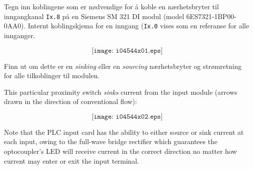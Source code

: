 

Tegn inn koblingene som er nødvendige for å koble en nærhetsbryter til inngangkanal \texttt{Ix.8} på en Siemens SM 321 DI modul (model 6ES7321-1BP00-0AA0). Internt koblingskjema for en inngang (\texttt{Ix.0} vises som en referanse for alle innganger. 


$$\texttt{[image: i04544x01.eps]}$$

Finn ut om dette er en \textit{sinking} eller en \textit{sourcing} nærhetsbryter og strømretning for alle tilkoblinger til modulen. 


\vfil 

\eject






This particular proximity switch {\it sinks} current from the input module (arrows drawn in the direction of conventional flow):

$$\texttt{[image: i04544x02.eps]}$$

Note that the PLC input card has the ability to either source or sink current at each input, owing to the full-wave bridge rectifier which guarantees the optocoupler's LED will receive current in the correct direction no matter how current may enter or exit the input terminal.











